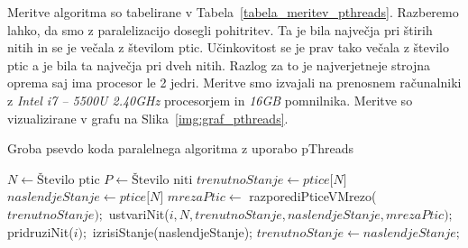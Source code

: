 \documentclass[a4paper, 12pt]{book}
\begin{document}
Meritve algoritma so tabelirane v Tabela~\ref{tabela_meritev_pthreads}. Razberemo lahko, da smo z paralelizacijo dosegli pohitritev. Ta je bila največja pri štirih nitih in se je večala z številom ptic. Učinkovitost se je prav tako večala z število ptic a je bila ta največja pri dveh nitih. Razlog za to je najverjetneje strojna oprema saj ima procesor le 2 jedri. Meritve smo izvajali na prenosnem računalniki z \textit{Intel i7 – 5500U 2.40GHz} procesorjem in \textit{16GB} pomnilnika. Meritve so vizualizirane v grafu na Slika~\ref{img:graf_pthreads}.

\begin{algorithm}
\caption{Groba psevdo koda paralelnega algoritma z uporabo pThreads}\label{paralel_pthreads_pseudo_code}
\begin{algorithmic}[1]
\State $N \gets \text{Število ptic}$
\State $P \gets \text{Število niti}$
\State $trenutnoStanje \gets \textit{ptice[N]}$
\State $naslendjeStanje \gets \textit{ptice[N]}$
\Loop
\State $mrezaPtic \gets$ razporediPticeVMrezo($trenutnoStanje);$
\State ustvariNit($i, N, trenutnoStanje, naslendjeStanje, mrezaPtic);$
\EndFor
{}
\State pridruziNit($i);$
\EndFor
\State izrisiStanje(naslendjeStanje);
\State $trenutnoStanje \gets naslendjeStanje;$
\EndLoop
\end{algorithmic}
\end{algorithm}
\end{document}
